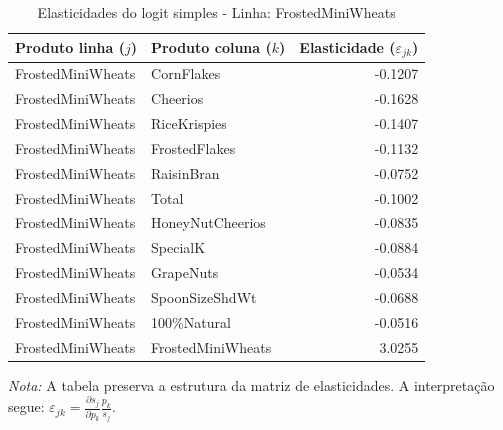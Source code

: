 \begingroup
\begin{table}[H]
\centering
\caption{Elasticidades do logit simples - Linha: FrostedMiniWheats}
\label{tab:elas-frostedminiwheats}
\small
\begin{tabular}{llr}
\toprule
Produto linha ($j$) & Produto coluna ($k$) & Elasticidade ($\varepsilon_{jk}$) \\
\midrule
FrostedMiniWheats & CornFlakes & -0.1207 \\
FrostedMiniWheats & Cheerios & -0.1628 \\
FrostedMiniWheats & RiceKrispies & -0.1407 \\
FrostedMiniWheats & FrostedFlakes & -0.1132 \\
FrostedMiniWheats & RaisinBran & -0.0752 \\
FrostedMiniWheats & Total & -0.1002 \\
FrostedMiniWheats & HoneyNutCheerios & -0.0835 \\
FrostedMiniWheats & SpecialK & -0.0884 \\
FrostedMiniWheats & GrapeNuts & -0.0534 \\
FrostedMiniWheats & SpoonSizeShdWt & -0.0688 \\
FrostedMiniWheats & 100\%Natural & -0.0516 \\
FrostedMiniWheats & FrostedMiniWheats & 3.0255 \\
\bottomrule
\end{tabular}

\vspace{0.3em}
\footnotesize
\textit{Nota:} A tabela preserva a estrutura da matriz de elasticidades. A interpretação segue: $\varepsilon_{jk}=\frac{\partial s_j}{\partial p_k}\frac{p_k}{s_j}$.
\end{table}
\endgroup

